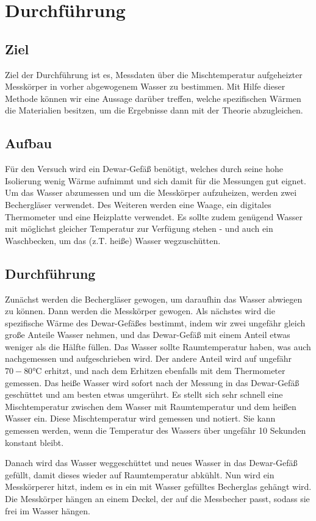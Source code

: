 \section{Durchführung}
\label{sec:Durchführung}
\subsection{Ziel}
Ziel der Durchführung ist es, Messdaten über die Mischtemperatur aufgeheizter Messkörper in vorher abgewogenem Wasser zu bestimmen.
Mit Hilfe dieser Methode können wir eine Aussage darüber treffen, welche spezifischen Wärmen die Materialien besitzen, um die Ergebnisse dann mit der Theorie abzugleichen.

\subsection{Aufbau}
Für den Versuch wird ein Dewar-Gefäß benötigt, welches durch seine hohe Isolierung wenig Wärme aufnimmt und sich damit für die Messungen gut eignet. 
Um das Wasser abzumessen und um die Messkörper aufzuheizen, werden zwei Bechergläser verwendet.
Des Weiteren werden eine Waage, ein digitales Thermometer und eine Heizplatte verwendet.
Es sollte zudem genügend Wasser mit möglichst gleicher Temperatur zur Verfügung stehen - und auch ein Waschbecken, um das (z.T. heiße) Wasser wegzuschütten.

\subsection{Durchführung}
Zunächst werden die Bechergläser gewogen, um daraufhin das Wasser abwiegen zu können. Dann werden die Messkörper gewogen.
Als nächstes wird die spezifische Wärme des Dewar-Gefäßes bestimmt, indem wir zwei ungefähr gleich große Anteile Wasser nehmen, und das Dewar-Gefäß
mit einem Anteil etwas weniger als die Hälfte füllen. Das Wasser sollte Raumtemperatur haben, was auch nachgemessen und aufgeschrieben wird.
Der andere Anteil wird auf ungefähr $70-80\si{\celsius}$ erhitzt, und nach dem Erhitzen ebenfalls mit dem Thermometer gemessen.
Das heiße Wasser wird sofort nach der Messung in das Dewar-Gefäß geschüttet und am besten etwas umgerührt.
Es stellt sich sehr schnell eine Mischtemperatur zwischen dem Wasser mit Raumtemperatur und dem heißen Wasser ein.
Diese Mischtemperatur wird gemessen und notiert. Sie kann gemessen werden, wenn die Temperatur des Wassers über ungefähr 10 Sekunden konstant bleibt.

Danach wird das Wasser weggeschüttet und neues Wasser in das Dewar-Gefäß gefüllt, damit dieses wieder auf Raumtemperatur abkühlt.
Nun wird ein Messkörperer hitzt, indem es in ein mit Wasser gefülltes Becherglas gehängt wird. Die Messkörper hängen an einem Deckel, der auf
die Messbecher passt, sodass sie frei im Wasser hängen.

